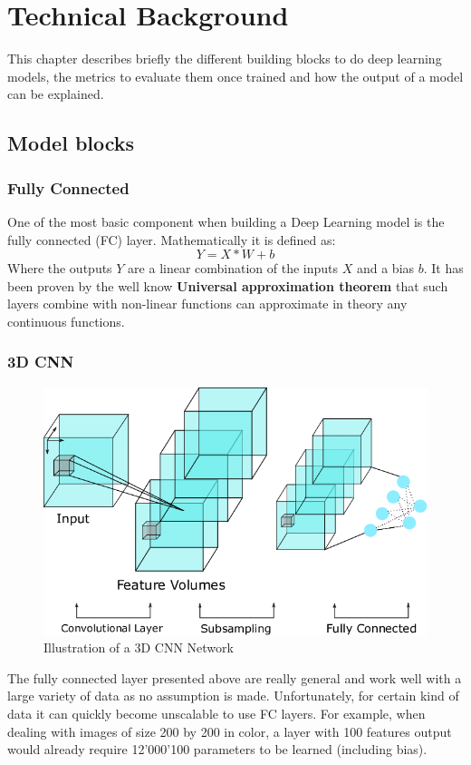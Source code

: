 \chapter{Technical Background}
This chapter describes briefly the different building blocks to do deep learning models, the metrics to evaluate them once trained and how the output of a model can be explained.

\section{Model blocks}

\subsection{Fully Connected}

One of the most basic component when building a Deep Learning model is the fully connected (FC) layer. Mathematically it is defined as:
$$Y=X*W + b$$
Where the outputs $Y$ are a linear combination of the inputs $X$ and a bias $b$. It has been proven by the well know \textbf{Universal approximation theorem} that such layers combine with non-linear functions can approximate in theory any continuous functions.

\subsection{3D CNN}

\begin{figure}
 \centering
 \includegraphics[width=.9\linewidth]{figures/3D_CNN_example.png}
 \captionsetup{width=.9\linewidth}
 \caption[3D_CNN_example]{Illustration\footnotemark{} of a 3D CNN Network}
 \label{fig:3d_cnn_example}
\end{figure}
The fully connected layer presented above are really general and work well with a large variety of data as no assumption is made. Unfortunately, for certain kind of data it can quickly become unscalable to use FC layers. For example, when dealing with images of size 200 by 200 in color, a layer with 100 features output would already require 12'000'100 parameters to be learned (including bias).

